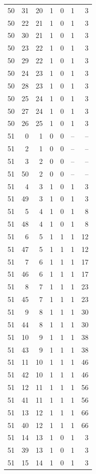 \begin{longtable}{rrrrrrr}
50 & 31 & 20 & 1 & 0 & 1 & 3\\
50 & 22 & 21 & 1 & 0 & 1 & 3\\
50 & 30 & 21 & 1 & 0 & 1 & 3\\
50 & 23 & 22 & 1 & 0 & 1 & 3\\
50 & 29 & 22 & 1 & 0 & 1 & 3\\
50 & 24 & 23 & 1 & 0 & 1 & 3\\
50 & 28 & 23 & 1 & 0 & 1 & 3\\
50 & 25 & 24 & 1 & 0 & 1 & 3\\
50 & 27 & 24 & 1 & 0 & 1 & 3\\
50 & 26 & 25 & 1 & 0 & 1 & 3\\
51 & 0 & 1 & 0 & 0 & -- & --\\
51 & 2 & 1 & 0 & 0 & -- & --\\
51 & 3 & 2 & 0 & 0 & -- & --\\
51 & 50 & 2 & 0 & 0 & -- & --\\
51 & 4 & 3 & 1 & 0 & 1 & 3\\
51 & 49 & 3 & 1 & 0 & 1 & 3\\
51 & 5 & 4 & 1 & 0 & 1 & 8\\
51 & 48 & 4 & 1 & 0 & 1 & 8\\
51 & 6 & 5 & 1 & 1 & 1 & 12\\
51 & 47 & 5 & 1 & 1 & 1 & 12\\
51 & 7 & 6 & 1 & 1 & 1 & 17\\
51 & 46 & 6 & 1 & 1 & 1 & 17\\
51 & 8 & 7 & 1 & 1 & 1 & 23\\
51 & 45 & 7 & 1 & 1 & 1 & 23\\
51 & 9 & 8 & 1 & 1 & 1 & 30\\
51 & 44 & 8 & 1 & 1 & 1 & 30\\
51 & 10 & 9 & 1 & 1 & 1 & 38\\
51 & 43 & 9 & 1 & 1 & 1 & 38\\
51 & 11 & 10 & 1 & 1 & 1 & 46\\
51 & 42 & 10 & 1 & 1 & 1 & 46\\
51 & 12 & 11 & 1 & 1 & 1 & 56\\
51 & 41 & 11 & 1 & 1 & 1 & 56\\
51 & 13 & 12 & 1 & 1 & 1 & 66\\
51 & 40 & 12 & 1 & 1 & 1 & 66\\
51 & 14 & 13 & 1 & 0 & 1 & 3\\
51 & 39 & 13 & 1 & 0 & 1 & 3\\
51 & 15 & 14 & 1 & 0 & 1 & 3\\

\end{longtable}
